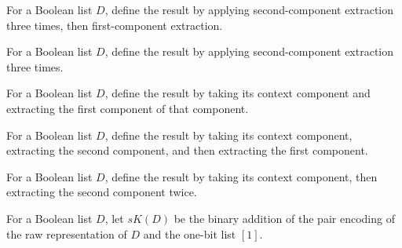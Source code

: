 \begin{definition}
\label{Randomized.PIT.sI}
\leanok
{}
For a Boolean list $D$, define the result by applying second-component extraction three
times, then first-component extraction.
\end{definition}

\begin{definition}
\label{Randomized.PIT.sL}
\leanok
{}
For a Boolean list $D$, define the result by applying second-component extraction three
times.
\end{definition}

\begin{definition}
\label{Randomized.PIT.sN}
\leanok
{}
For a Boolean list $D$, define the result by taking its context component and extracting
the first component of that component.
\end{definition}

\begin{definition}
\label{Randomized.PIT.sRaw}
\leanok
{}
For a Boolean list $D$, define the result by taking its context component, extracting
the second component, and then extracting the first component.
\end{definition}

\begin{definition}
\label{Randomized.PIT.sPts}
\leanok
{}
For a Boolean list $D$, define the result by taking its context component, then
extracting the second component twice.
\end{definition}

\begin{definition}
\label{Randomized.PIT.sK}
\leanok
{}
For a Boolean list $D$, let $sK(D)$ be the binary addition of the pair encoding of the
raw representation of $D$ and the one-bit list $[1]$.
\end{definition}


